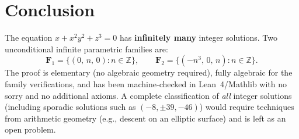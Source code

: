 \documentclass[12pt,a4paper]{article}
\theoremstyle{definition}
\newcommand{\Z}{\mathbb{Z}}
\begin{document}
\section{Conclusion}

The equation $x + x^2 y^2 + z^3 = 0$ has \textbf{infinitely many} integer solutions.
Two unconditional infinite parametric families are:
\[
  \mathbf{F}_1 = \{(0,\, n,\, 0) : n \in \Z\},
  \qquad
  \mathbf{F}_2 = \{(-n^3,\, 0,\, n) : n \in \Z\}.
\]
The proof is elementary (no algebraic geometry required), fully algebraic for the family
verifications, and has been machine-checked in Lean~4/Mathlib with no sorry and no
additional axioms.  A complete classification of \emph{all} integer solutions (including
sporadic solutions such as $(-8, \pm 39, -46)$) would require techniques from arithmetic
geometry (e.g., descent on an elliptic surface) and is left as an open problem.
\end{document}
